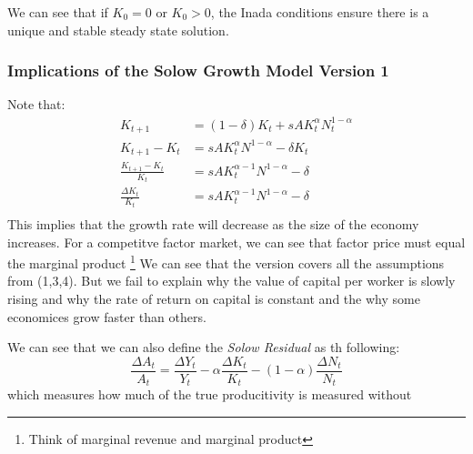 \documentclass[11pt]{article}
\begin{document}
We can see that if $K_0 = 0$ or $K_0 > 0$, the Inada conditions ensure there is a unique and stable steady state solution. 


\subsubsection{Implications of the Solow Growth Model Version 1}

Note that:
\begin{align*}
    K_{t+1} &= (1-\delta) K_t + sA K_t^\alpha N_t^{1-\alpha} \\
    K_{t+1} - K_t &= sA K_t^\alpha N^{1-\alpha} - \delta K_t\\
    \frac{K_{t+1} - K_t}{K_t} &= sA K_t^{\alpha-1}N^{1 - \alpha } - \delta\\
    \frac{\Delta K_t}{K_t} &= sA K_t^{\alpha - 1}N^{1- \alpha } - \delta\\
\end{align*}
This implies that the growth rate will decrease as the size of the economy increases. For a competitve factor market, we can see that factor price must equal the marginal product \footnote{Think of marginal revenue and marginal product}
We can see that the version covers all the assumptions from (1,3,4). But we fail to explain why the value of capital per worker is slowly rising and why the rate of return on capital is constant and the why some economices grow faster than others. 


We can see that we can also define the \emph{Solow Residual} as th following:
\[
\frac{\Delta A_t}{A_t} = \frac{\Delta Y_t}{Y_t} - \alpha \frac{\Delta K_t}{K_t} - (1-\alpha) \frac{\Delta N_t}{N_t}
\]
which measures how much of the true producitivity is measured without 
\end{document}
